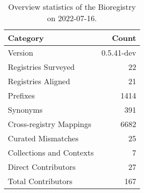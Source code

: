 \begin{table}
\centering
\caption{Overview statistics of the Bioregistry on 2022-07-16.}
\label{tab:bioregistry-summary}
\begin{tabular}{lr}
\toprule
                Category &      Count \\
\midrule
                 Version & 0.5.41-dev \\
     Registries Surveyed &         22 \\
      Registries Aligned &         21 \\
                Prefixes &       1414 \\
                Synonyms &        391 \\
 Cross-registry Mappings &       6682 \\
      Curated Mismatches &         25 \\
Collections and Contexts &          7 \\
     Direct Contributors &         27 \\
      Total Contributors &        167 \\
\bottomrule
\end{tabular}
\end{table}
